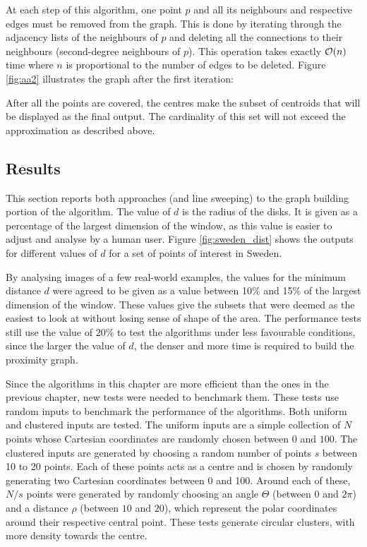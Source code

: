 At each step of this algorithm, one point $p$ and all its neighbours and respective edges must be removed from the graph. This is done by iterating through the adjacency lists of the neighbours of $p$ and deleting all the connections to their neighbours (second-degree neighbours of $p$). This operation takes exactly $\mathcal{O}(n)$ time where $n$ is proportional to the number of edges to be deleted. Figure \ref{fig:aa2} illustrates the graph after the first iteration:



After all the points are covered, the centres make the subset of centroids that will be displayed as the final output. The cardinality of this set will not exceed the approximation as described above.


\subsection{Results}
This section reports both approaches (\kdtrees and line sweeping) to the graph building portion of the algorithm. The value of $d$ is the radius of the disks. It is given as a percentage of the largest dimension of the window, as this value is easier to adjust and analyse by a human user.
Figure \ref{fig:sweden_dist} shows the outputs for different values of $d$ for a set of points of interest in Sweden.


\begin{change}
By analysing images of a few real-world examples, the values for the minimum distance $d$ were agreed to be given as a value between 10\% and 15\% of the largest dimension of the window. These values give the subsets that were deemed as the easiest to look at without losing sense of shape of the area. The performance tests still use the value of 20\% to test the algorithms under less favourable conditions, since the larger the value of $d$, the denser and more time is required to build the proximity graph. 
\end{change}

Since the algorithms in this chapter are more efficient than the ones in the previous chapter, new tests were needed to benchmark them. These tests use random inputs to benchmark the performance of the algorithms. Both uniform and clustered inputs are tested. The uniform inputs are a simple collection of $N$ points whose Cartesian coordinates are randomly chosen between $0$ and $100$. The clustered inputs are generated by choosing a random number of points $s$ between 10 to 20 points. Each of these points acts as a centre and is chosen by randomly generating two Cartesian coordinates between 0 and 100. Around each of these, $N/s$ points were generated by randomly choosing an angle $\Theta$ (between $0$ and $2\pi$) and a distance $\rho$ (between $10$ and $20$), which represent the polar coordinates around their respective central point. These tests generate circular clusters, with more density towards the centre.

